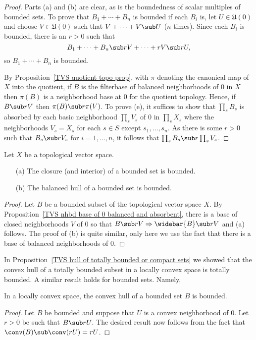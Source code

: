 \begin{proof}
Parts (a) and (b) are clear, as is the boundedness of scalar multiples of bounded sets. To prove that $B_1+\cdots+B_n$ is bounded if each $B_i$ is, let $U\in\mathfrak{U}(0)$ and choose $V\in\mathfrak{U}(0)$ such that $V+\cdots+V\sub U$ ($n$ times). Since each $B_i$ is bounded, there is an $r>0$ such that
\[B_1+\cdots+B_n\sub rV+\cdots+rV\sub rU,\]
so $B_1+\cdots+B_n$ is bounded.\par
By Proposition~\ref{TVS quotient topo prop}, with $\pi$ denoting the canonical map of $X$ into the quotient, if $B$ is the filterbase of balanced neighborhoods of $0$ in $X$ then $\pi(B)$ is a neighborhood base at $0$ for the quotient topology. Hence, if $B\sub rV$ then $\pi(B)\sub r\pi(V)$. To prove (e), it suffices to show that $\prod_sB_s$ is absorbed by each basic neighborhood $\prod_sV_s$ of $0$ in $\prod_sX_s$ where the neighborhoods $V_s=X_s$ for each $s\in S$ except $s_1,\dots,s_n$. As there is some $r>0$ such that $B_s\sub rV_s$ for $i=1,\dots,n$, it follows that $\prod_sB_s\sub r\prod_sV_s$.
\end{proof}
\begin{proposition}\label{TVS bounded set closure bal}
Let $X$ be a topological vector space.
\begin{itemize}
\item[(a)] The closure (and interior) of a bounded set is bounded.
\item[(b)] The balanced hull of a bounded set is bounded.
\end{itemize}
\end{proposition}
\begin{proof}
Let $B$ be a bounded subset of the topological vector space $X$. By Proposition~\ref{TVS nhbd base of 0 balanced and absorbent}, there is a base of closed neighborhoods $V$ of $0$ so that $B\sub rV\Rightarrow\widebar{B}\sub rV$ and (a) follows. The proof of (b) is quite similar, only here we use the fact that there is a base of balanced neighborhoods of $0$.
\end{proof}
In Proposition~\ref{TVS hull of totally bounded or compact sets} we showed that the convex hull of a totally bounded subset in a locally convex space is totally bounded. A similar result holds for bounded sets. Namely,
\begin{proposition}\label{LCS convex hull of bounded}
In a locally convex space, the convex hull of a bounded set $B$ is bounded.
\end{proposition}
\begin{proof}
Let $B$ be bounded and suppose that $U$ is a convex neighborhood of $0$. Let $r>0$ be such that $B\sub rU$. The desired result now follows from the
fact that $\conv(B)\sub\conv(rU)=rU$.
\end{proof}

